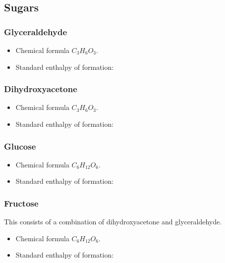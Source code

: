 \documentclass{article}
\begin{document}
\subsection{Sugars}

\subsubsection{Glyceraldehyde}
\begin{itemize}
    \item Chemical formula $C_3H_6O_3$.
    \item Standard enthalpy of formation:
\end{itemize}

\subsubsection{Dihydroxyacetone}
\begin{itemize}
    \item Chemical formula $C_3H_6O_3$.
    \item Standard enthalpy of formation:
\end{itemize}

\subsubsection{Glucose}
\begin{itemize}
    \item Chemical formula $C_6H_{12}O_6$.
    \item Standard enthalpy of formation:
\end{itemize}

\subsubsection{Fructose}
This consists of a combination of dihydroxyacetone and glyceraldehyde.

\begin{itemize}
    \item Chemical formula $C_6H_{12}O_6$.
    \item Standard enthalpy of formation:
\end{itemize}
\end{document}
